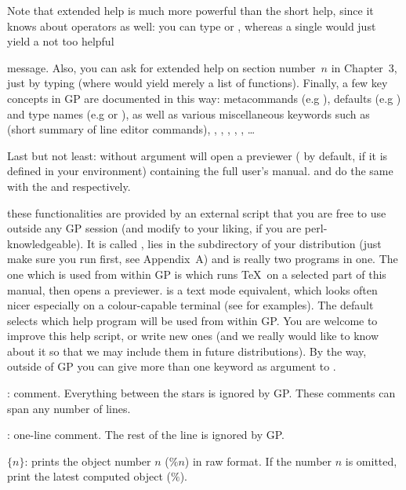 Note that extended help is much more powerful than the short help, since
it knows about operators as well: you can type  or
, whereas a single  would just yield a not too helpful


\noindent message. Also, you can ask for extended help on section
number~$n$ in Chapter~3, just by typing  (where  would
yield merely a list of functions). Finally, a few key concepts in GP are
documented in this way: metacommands (e.g ), defaults (e.g
) and type names (e.g  or ), as well as
various miscellaneous keywords such as  (short summary of line
editor commands), , , ,
, , \dots

Last but not least:  without argument will open a 
previewer ( by default,  if it is defined in your
environment) containing the full user's manual.  and
 do the same with the  and 
respectively.

 these functionalities are provided by an
external  script that you are free to use outside any GP session
(and modify to your liking, if you are perl-knowledgeable). It is called
, lies in the  subdirectory of your distribution
(just make sure you run  first, see Appendix~A) and is
really two programs in one. The one which is used from within GP is
 which runs \TeX\ on a selected part of this manual, then opens
a previewer.  is a text mode equivalent, which looks
often nicer especially on a colour-capable terminal (see
 for examples). The default  selects which
help program will be used from within GP. You are welcome to improve this
help script, or write new ones (and we really would like to know about it
so that we may include them in future distributions). By the way, outside
of GP you can give more than one keyword as argument to .

: comment. Everything between the stars is ignored by
GP. These comments can span any number of lines.

\subseckbd{\bs\bs}: one-line comment. The rest of the line
is ignored by GP.

 $\{n\}$: prints the object number $n$ ($\%n$)
in raw format. If the number $n$ is omitted, print the latest computed object
($\%$). \label{se:history}

